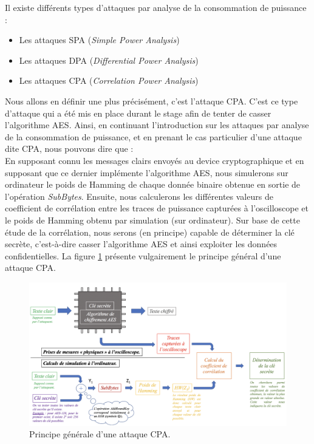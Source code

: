 \documentclass[10pt, oneside, a4paper]{article}
\begin{document}
\hspace{-0.5 cm}Il existe différents types d'attaques par analyse de la consommation de puissance : 
\begin{itemize}
\item Les attaques SPA (\textit{Simple Power Analysis})
\item Les attaques DPA (\textit{Differential Power Analysis})
\item Les attaques CPA (\textit{Correlation Power Analysis}) \\
\end{itemize}
Nous allons en définir une plus précisément, c'est l'attaque CPA. C'est ce type d'attaque qui a été mis en place durant le stage afin de tenter de casser l'algorithme AES. Ainsi, en continuant l'introduction sur les attaques par analyse de la consommation de puissance, et en prenant le cas particulier d'une attaque dite CPA, nous pouvons dire que : \\ En supposant connu les messages clairs envoyés au device cryptographique et en supposant que ce dernier implémente l'algorithme AES, nous simulerons sur ordinateur le poids de Hamming de chaque donnée binaire obtenue en sortie de l'opération \textit{SubBytes}. Ensuite, nous calculerons les différentes valeurs de coefficient de corrélation entre les traces de puissance capturées à l'oscilloscope et le poids de Hamming obtenu par simulation (sur ordinateur). Sur base de cette étude de la corrélation, nous serons (en principe) capable de déterminer la clé secrète, c'est-à-dire casser l'algorithme AES et ainsi exploiter les données confidentielles. La figure \ref{fig:CPA} présente vulgairement le principe général d'une attaque CPA.
\begin{figure}[h]
    \hspace{-1.5 cm}
    \includegraphics[scale=0.55]{image/CPA}
    \caption{Principe générale d'une attaque CPA.}
    \label{fig:CPA} 
\end{figure}
\end{document}
